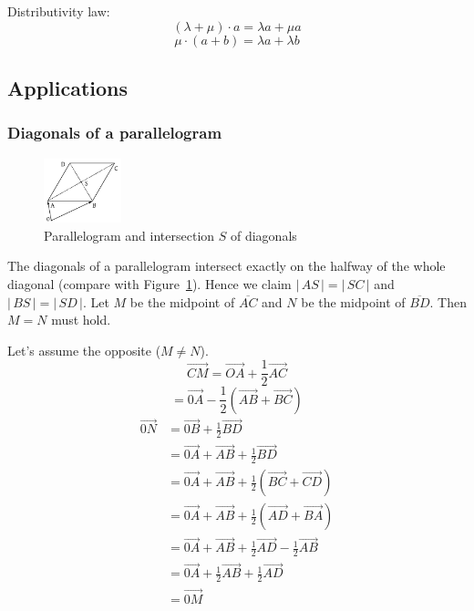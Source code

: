 \documentclass[a4paper,landscape,twocolumn]{article}
\newcommand\card[1]{\left|\,#1\,\right|}
\begin{document}
Distributivity law:
\[ (\lambda + \mu) \cdot a = \lambda a + \mu a \]
\[ \mu \cdot (a + b) = \lambda a + \lambda b \]

\subsection{Applications}
\subsubsection{Diagonals of a parallelogram}
%
\begin{figure}[!h]
  \begin{center}
    \includegraphics[width=0.2\textwidth]{img/parallelogram.pdf}
    \caption{Parallelogram and intersection $S$ of diagonals}
    \label{img:parallelogram}
  \end{center}
\end{figure}

The diagonals of a parallelogram intersect exactly on the halfway of the whole diagonal (compare with Figure~\ref{img:parallelogram}).
Hence we claim $\card{AS} = \card{SC}$ and $\card{BS} = \card{SD}$.
Let $M$ be the midpoint of $\overline{AC}$ and $N$ be the midpoint of $\overline{BD}$.
Then $M = N$ must hold.

Let's assume the opposite ($M \neq N$).
\[ \overrightarrow{CM} = \overrightarrow{OA} + \frac12 \overrightarrow{AC} \]
\[ = \overrightarrow{0A} - \frac12 \left(\overrightarrow{AB} + \overrightarrow{BC}\right) \]
\begin{align*}
  \overrightarrow{0N} &= \overrightarrow{0B} + \frac12 \overrightarrow{BD} \\
    &= \overrightarrow{0A} + \overrightarrow{AB} + \frac12 \overrightarrow{BD} \\
    &= \overrightarrow{0A} + \overrightarrow{AB} + \frac12 \left(\overrightarrow{BC} + \overrightarrow{CD}\right) \\
    &= \overrightarrow{0A} + \overrightarrow{AB} + \frac12 \left(\overrightarrow{AD} + \overrightarrow{BA}\right) \\
    &= \overrightarrow{0A} + \overrightarrow{AB} + \frac12 \overrightarrow{AD} - \frac12 \overrightarrow{AB} \\
    &= \overrightarrow{0A} + \frac12 \overrightarrow{AB} + \frac12 \overrightarrow{AD} \\
    &= \overrightarrow{0M}
\end{align*}
\end{document}

